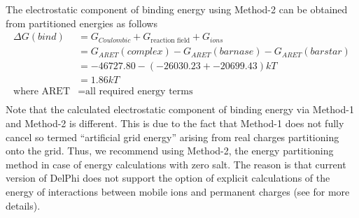 \documentclass[9pt,tutorial]{livecoms}
\begin{document}
The electrostatic component of binding energy using Method-2 can be obtained from partitioned energies as follows
\begin{equation}
\begin{aligned}
\Delta G(bind) &= G_{Coulombic} + G_{\text{reaction field}} + G_{ions}\\
               &= G_{ARET}(complex) - G_{ARET}(barnase) - G_{ARET}(barstar) \\
               &= -46727.80 - (-26030.23 + -20699.43) kT \\
               &= 1.86 kT \\
\text{where ARET} &= \text{all required energy terms} \\
\end{aligned}
\end{equation}            
Note that the calculated electrostatic component of binding energy via Method-1 and Method-2 is different. This is due to the fact that Method-1 does not fully cancel so termed ``artificial grid energy'' arising from real charges partitioning onto the grid. Thus, we recommend using Method-2, the energy partitioning method in case of energy calculations with zero salt. The reason is that current version of DelPhi does not support the option of explicit calculations of the energy of interactions between mobile ions and permanent charges (see \cite{rocchia2001extending} for more details).
\end{document}
